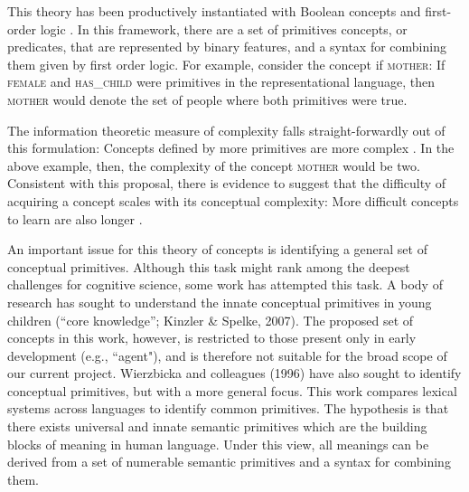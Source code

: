 This theory has been productively instantiated with Boolean concepts and first-order logic \cite{shepard1961learning,feldman2000minimization,goodman2008rational}.  In this  framework, there are a set of primitives concepts, or predicates, that are represented by binary features, and a syntax for combining them given by first order logic.  For example, consider the concept if \textsc{mother}: If \textsc{female} and \textsc{has\_child} were primitives in the representational language, then  \textsc{mother} would denote the set of people where both primitives were true. 

The information theoretic measure of complexity falls straight-forwardly out of this formulation: Concepts defined by more primitives are more complex \cite{shepard1961learning,feldman2000minimization,goodman2008rational}. In the  above example, then, the complexity of the concept  \textsc{mother} would be two. Consistent with this proposal, there is evidence to suggest that the difficulty of acquiring a concept scales with its conceptual complexity: More difficult concepts to learn are also longer \cite{shepard1961learning,feldman2000minimization}.

An important issue for this theory of concepts is identifying a general set of conceptual primitives. Although this task might rank among the deepest challenges for cognitive science, some work has attempted this task. A body of research has sought to understand the innate conceptual primitives in young children (``core knowledge''; Kinzler \& Spelke, 2007). \nocite{kinzler2007core} The proposed set of concepts in this work, however, is restricted to those present only  in early development (e.g., ``agent"), and is therefore not suitable for the broad scope of our current project.  Wierzbicka and colleagues (1996) have also  sought  to identify conceptual primitives, but with a more general focus.  \nocite{wierzbicka1996semantics} This work compares lexical systems across languages  to identify common primitives. The hypothesis is that there exists universal and innate semantic primitives which are the building blocks of meaning in human language. Under this view, all meanings can be derived from a set of numerable semantic primitives and a syntax for combining them.

